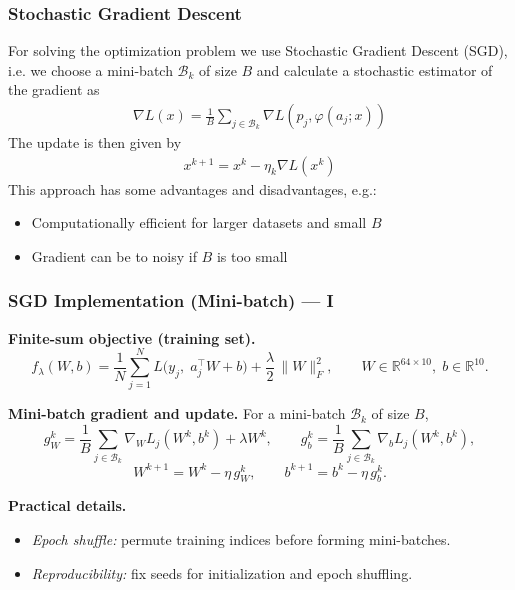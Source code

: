 \documentclass[12pt]{beamer}
\begin{document}
    \begin{frame}
        \frametitle{Stochastic Gradient Descent}
        For solving the optimization problem we use Stochastic Gradient Descent (SGD), i.e. we choose a mini-batch $\mathcal{B}_k$ of size $B$ and calculate a stochastic estimator of the gradient as
        \begin{align*}
            \nabla L(x) = \frac{1}{B} \sum_{j \in \mathcal{B}_k} \nabla L(p_j, \varphi(a_j;x))
        \end{align*}
        The update is then given by
        \begin{align*}
            x^{k+1} = x^k - \eta_k \nabla L(x^k)
        \end{align*}
        This approach has some advantages and disadvantages, e.g.:
        \begin{itemize}
            \item Computationally efficient for larger datasets and small $B$
            \item Gradient can be to noisy if $B$ is too small
        \end{itemize}
    \end{frame}
    \begin{frame}[fragile]
    \frametitle{SGD Implementation (Mini-batch) --- I}
    \small
    \textbf{Finite-sum objective (training set).}\;
    \[
    f_\lambda(W,b)
    =
    \frac{1}{N}\sum_{j=1}^{N} L\!\big(y_j,\; a_j^\top W + b\big)
    +\frac{\lambda}{2}\,\|W\|_F^2,
    \qquad
    W\in\mathbb{R}^{64\times 10},\; b\in\mathbb{R}^{10}.
    \]

    \vspace{0.15cm}
    \textbf{Mini-batch gradient and update.}\;
    For a mini-batch $\mathcal{B}_k$ of size $B$,
    \[
    g_W^k=\frac{1}{B}\sum_{j\in\mathcal{B}_k}\nabla_W L_j(W^k,b^k) + \lambda W^k,
    \qquad
    g_b^k=\frac{1}{B}\sum_{j\in\mathcal{B}_k}\nabla_b L_j(W^k,b^k),
    \]
    \[
    W^{k+1}=W^k-\eta\, g_W^k,
    \qquad
    b^{k+1}=b^k-\eta\, g_b^k.
    \]

    \vspace{0.15cm}
    \textbf{Practical details.}
    \begin{itemize}
        \item \emph{Epoch shuffle:} permute training indices before forming mini-batches.
        \item \emph{Reproducibility:} fix seeds for initialization and epoch shuffling.
    \end{itemize}
    \end{frame}
\end{document}
